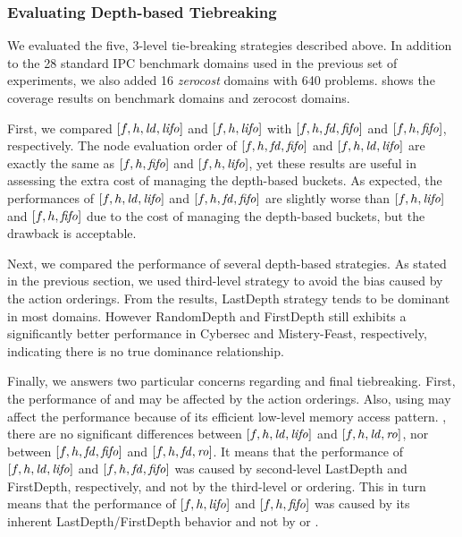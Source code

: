 \subsubsection{Evaluating Depth-based Tiebreaking}

We evaluated the five, 3-level tie-breaking strategies described above.
% 
In addition to the 28 standard IPC benchmark domains used in the previous set of experiments, we also added 16 \emph{zerocost} domains with 640 problems. 
 shows the coverage results on benchmark domains and
zerocost domains.

First, we compared $[f,h,\mbox{\textit{ld}},\mbox{\textit{lifo}}]$ and
$[f,h,\mbox{\textit{lifo}}]$ with $[f,h,\mbox{\textit{fd}},\mbox{\textit{fifo}}]$ and $[f,h,\mbox{\textit{fifo}}]$, respectively.
The node evaluation order of $[f,h,\mbox{\textit{fd}},\mbox{\textit{fifo}}]$ and $[f,h,\mbox{\textit{ld}},\mbox{\textit{lifo}}]$
are exactly the same as $[f,h,\mbox{\textit{fifo}}]$ and $[f,h,\mbox{\textit{lifo}}]$,
yet these results are useful in assessing the extra cost of managing the
depth-based buckets.
As expected, the performances of $[f,h,\mbox{\textit{ld}},\mbox{\textit{lifo}}]$ and
$[f,h,\mbox{\textit{fd}},\mbox{\textit{fifo}}]$ are slightly worse than $[f,h,\mbox{\textit{lifo}}]$ and
$[f,h,\mbox{\textit{fifo}}]$ due to the cost of managing the depth-based buckets, but
the drawback is acceptable.

Next, we compared the performance of several depth-based strategies.
As stated in the previous section, we used \ro third-level strategy to
avoid the bias caused by the action orderings.
From the results, LastDepth strategy tends to be dominant in most domains. However RandomDepth and
FirstDepth still exhibits a significantly better performance in Cybersec
and Mistery-Feast, respectively, indicating there is no true dominance relationship.

Finally, we answers two particular concerns regarding \lifo and \fifo
final tiebreaking.  First, the performance of \lifo and \fifo may be
affected by the action orderings. Also, using \lifo may affect the
performance because of its efficient low-level memory access pattern.
, there are no
significant differences between $[f,h,\mbox{\textit{ld}},\mbox{\textit{lifo}}]$ and $[f,h,\mbox{\textit{ld}},\mbox{\textit{ro}}]$,
nor between $[f,h,\mbox{\textit{fd}},\mbox{\textit{fifo}}]$ and $[f,h,\mbox{\textit{fd}},\mbox{\textit{ro}}]$.  It means that the
performance of $[f,h,\mbox{\textit{ld}},\mbox{\textit{lifo}}]$ and $[f,h,\mbox{\textit{fd}},\mbox{\textit{fifo}}]$ was caused by
second-level LastDepth and FirstDepth, respectively, and not by the
third-level \lifo or \fifo ordering.  This in turn means that the
performance of $[f,h,\mbox{\textit{lifo}}]$ and $[f,h,\mbox{\textit{fifo}}]$ was caused by its
inherent LastDepth/FirstDepth behavior and not by \lifo or \fifo.

